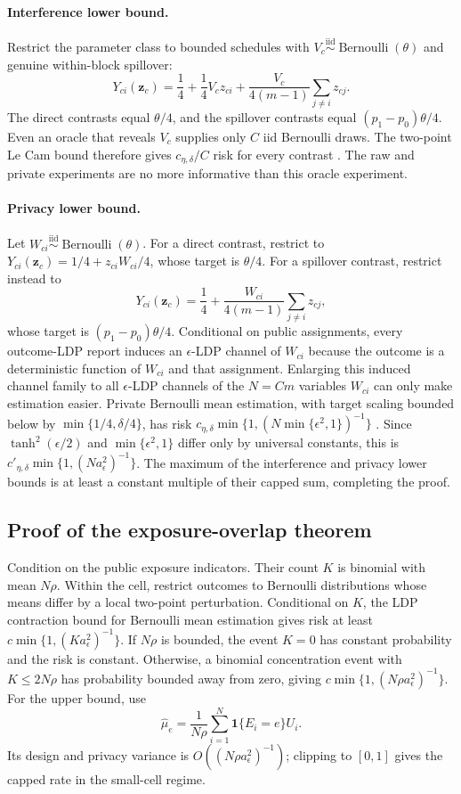 \documentclass[11pt]{article}
\theoremstyle{definition}
\theoremstyle{remark}
\newcommand{\ind}{\mathbf{1}}
\newcommand{\doisig}{a_{\epsilon}}
\DeclareMathOperator{\Bern}{Bernoulli}
\begin{document}
\paragraph{Interference lower bound.}
Restrict the parameter class to bounded schedules with
$V_c\stackrel{\mathrm{iid}}{\sim}\Bern(\theta)$ and genuine within-block spillover:
\[
Y_{ci}(\mathbf z_c)
=\frac14+\frac14V_cz_{ci}
+\frac{V_c}{4(m-1)}\sum_{j\ne i}z_{cj}.
\]
The direct contrasts equal $\theta/4$, and the spillover contrasts equal
$(p_1-p_0)\theta/4$. Even an oracle that reveals $V_c$ supplies only $C$ iid Bernoulli draws.
The two-point Le Cam bound therefore gives $c_{\eta,\delta}/C$ risk for every contrast
\citep{Yu1997,Tsybakov2009}. The raw and private experiments are no more informative than this
oracle experiment.

\paragraph{Privacy lower bound.}
Let $W_{ci}\stackrel{\mathrm{iid}}{\sim}\Bern(\theta)$. For a direct contrast, restrict to
$Y_{ci}(\mathbf z_c)=1/4+z_{ci}W_{ci}/4$, whose target is $\theta/4$. For a spillover contrast,
restrict instead to
\[
Y_{ci}(\mathbf z_c)=\frac14+
\frac{W_{ci}}{4(m-1)}\sum_{j\ne i}z_{cj},
\]
whose target is $(p_1-p_0)\theta/4$. Conditional on public assignments, every outcome-LDP
report induces an $\epsilon$-LDP channel of $W_{ci}$ because the outcome is a deterministic
function of $W_{ci}$ and that assignment. Enlarging this induced channel family to all
$\epsilon$-LDP channels of the $N=Cm$ variables $W_{ci}$ can only make estimation easier.
Private Bernoulli mean estimation, with target scaling bounded below by
$\min\{1/4,\delta/4\}$, has risk
$c_{\eta,\delta}\min\{1,(N\min\{\epsilon^2,1\})^{-1}\}$
\citep{DuchiJordanWainwright2018}. Since
$\tanh^2(\epsilon/2)$ and $\min\{\epsilon^2,1\}$ differ only by universal constants, this is
$c'_{\eta,\delta}\min\{1,(N\doisig^2)^{-1}\}$. The maximum of the interference and privacy
lower bounds is at least a constant multiple of their capped sum, completing the proof.

\subsection{Proof of the exposure-overlap theorem}

Condition on the public exposure indicators. Their count $K$ is binomial with mean $N\rho$.
Within the cell, restrict outcomes to Bernoulli distributions whose means differ by a local
two-point perturbation. Conditional on $K$, the LDP contraction bound for Bernoulli mean
estimation gives risk at least $c\min\{1,(K\doisig^2)^{-1}\}$. If $N\rho$ is bounded, the event
$K=0$ has constant probability and the risk is constant. Otherwise, a binomial concentration
event with $K\le2N\rho$ has probability bounded away from zero, giving
$c\min\{1,(N\rho\doisig^2)^{-1}\}$. For the upper bound, use
\[
  \widehat\mu_e=\frac1{N\rho}\sum_{i=1}^N
  \ind\{E_i=e\}U_i.
\]
Its design and privacy variance is $O((N\rho\doisig^2)^{-1})$; clipping to $[0,1]$ gives the
capped rate in the small-cell regime.
\end{document}
